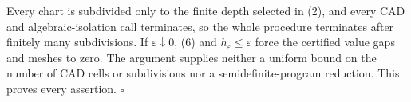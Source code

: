Every chart is subdivided only to the finite depth selected in (2), and every CAD and algebraic-isolation call terminates, so the whole procedure terminates after finitely many subdivisions.  If \(\varepsilon\downarrow0\), (6) and \(h_\varepsilon\le\varepsilon\) force the certified value gaps and meshes to zero.  The argument supplies neither a uniform bound on the number of CAD cells or subdivisions nor a semidefinite-program reduction.  This proves every assertion. \(\square\)